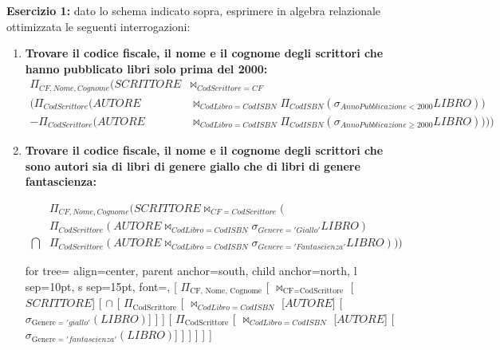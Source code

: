 \documentclass{article}
\begin{document}
\textbf{Esercizio 1:} dato lo schema indicato sopra, esprimere in algebra relazionale ottimizzata le seguenti interrogazioni:
\begin{enumerate}
	\item \textbf{Trovare il codice fiscale, il nome e il cognome degli scrittori che hanno pubblicato libri solo prima del 2000:}
	\begin{align*}
		\Pi_{CF,Nome,Cognome} (SCRITTORE &\bowtie_{CodScrittore = CF}\\(\Pi_{CodScrittore}(AUTORE&\bowtie_{CodLibro = CodISBN} \Pi_{CodISBN}(\sigma_{AnnoPubblicazione < 2000} LIBRO)) \\
		- \Pi_{CodScrittore}(AUTORE&\bowtie_{CodLibro = CodISBN} \Pi_{CodISBN}(\sigma_{AnnoPubblicazione \geq 2000} LIBRO))))
	\end{align*}
	
	
	\item \textbf{Trovare il codice fiscale, il nome e il cognome degli scrittori che sono autori sia di libri di genere giallo che di libri di genere fantascienza:}
	
	\begin{align*}
	&\Pi_{CF,Nome,Cognome}(SCRITTORE \bowtie_{CF = CodScrittore} (\\
	&\Pi_{CodScrittore}(AUTORE \bowtie_{CodLibro = CodISBN} \sigma_{Genere = 'Giallo'} LIBRO)\\
	\bigcap &\Pi_{CodScrittore}(AUTORE \bowtie_{CodLibro = CodISBN} \sigma_{Genere = 'Fantascienza'} LIBRO)
	))
	\end{align*}
	\begin{center}
		\begin{forest}
			for tree={
				align=center,
				parent anchor=south,
				child anchor=north,
				l sep=10pt,
				s sep=15pt,
				font=\sffamily,
			}
			[
			$\Pi_{\text{CF, Nome, Cognome}}$
			[
			$\bowtie_{\text{CF} = \text{CodScrittore}}$
			[$SCRITTORE$]
			[
			$\cap$
			[
			$\Pi_{\text{CodScrittore}}$
			[
			$\bowtie_{CodLibro = CodISBN}$
			[$AUTORE$]
			[$\sigma_{\text{Genere} = 'giallo'}(LIBRO)$]
			]
			]
			[
			$\Pi_{\text{CodScrittore}}$
			[
			$\bowtie_{CodLibro = CodISBN}$
			[$AUTORE$]
			[$\sigma_{\text{Genere} = 'fantascienza'}(LIBRO)$]
			]
			]
			]
			]
			]
		\end{forest}
	\end{center}
	

\end{enumerate}
\end{document}
